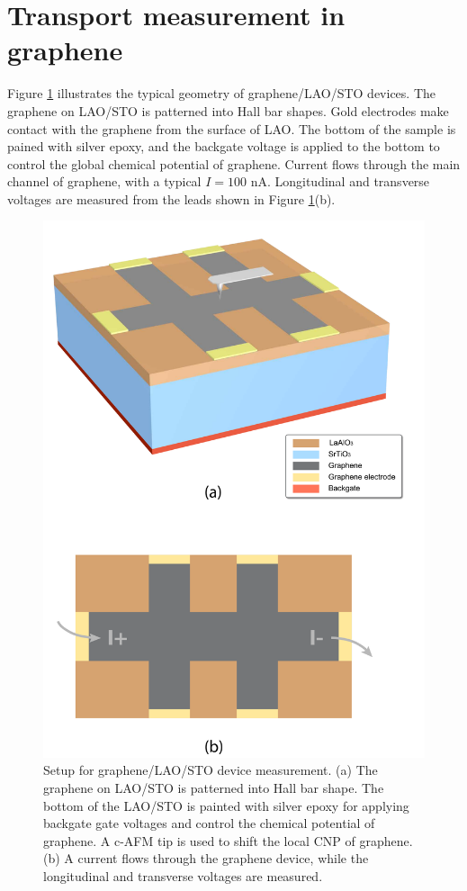 \documentclass[pdflatex, sectionletters, 12pt, final, phd]{pittetd}    %
\begin{document}
\section{Transport measurement in graphene}

Figure \ref{FIG:HallDevice} illustrates the typical geometry of graphene/LAO/STO devices. The graphene on LAO/STO is patterned into Hall bar shapes. Gold electrodes make contact with the graphene from the surface of LAO. The bottom of the sample is pained with silver epoxy, and the backgate voltage is applied to the bottom to control the global chemical potential of graphene. Current flows through the main channel of graphene, with a typical $I = 100$ nA. Longitudinal and transverse voltages are measured from the leads shown in Figure \ref{FIG:HallDevice}(b).

\begin{figure}[p]
	\centering
	\includegraphics[width=.7\textwidth]{Drawing/HallDevice.pdf}
	\caption[Setup for graphene/LAO/STO device measurement]{Setup for graphene/LAO/STO device measurement. (a) The graphene on LAO/STO is patterned into Hall bar shape. The bottom of the LAO/STO is painted with silver epoxy for applying backgate gate voltages and control the chemical potential of graphene. A c-AFM tip is used to shift the local CNP of graphene. (b) A current flows through the graphene device, while the longitudinal and transverse voltages are measured.}
	\label{FIG:HallDevice}
\end{figure}
\end{document}
